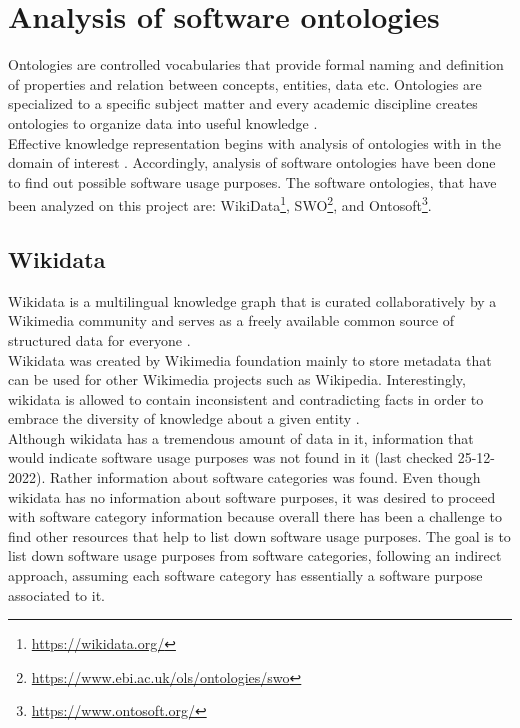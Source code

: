 \section{Analysis of software ontologies }
\label{sec:purpose:ontologies}

Ontologies are controlled vocabularies that provide formal naming and definition of properties and relation between concepts, entities, data etc.  Ontologies  are specialized  to a specific subject matter and every academic discipline creates ontologies to organize data into useful knowledge \citep{enwiki:1060388948}. \\

Effective knowledge representation begins with analysis of ontologies with in the domain of interest \citep{chandrasekaran1999ontologies}. Accordingly, analysis of software ontologies have been done to find out possible software usage purposes. The software ontologies, that have been analyzed on this project are: WikiData\footnote{\url{https://wikidata.org/}}, \ac{SWO}\footnote{\url{https://www.ebi.ac.uk/ols/ontologies/swo}}, and Ontosoft\footnote{\url{https://www.ontosoft.org/}}. 

 
\subsection{Wikidata}
\label{subsec:purpose:ontologies:Wikidata}

Wikidata is a multilingual knowledge graph that is curated collaboratively by a Wikimedia community and serves as a freely available common source of structured data for everyone \citep{enwiki:1060114687, enwiki:1060408581}. \\

Wikidata was created by Wikimedia foundation mainly to store metadata that can be used for other Wikimedia projects such as Wikipedia. Interestingly, wikidata is allowed to contain inconsistent and contradicting facts in order to embrace the diversity of knowledge about a given entity \citep{vrandevcic2012wikidata}. \\

Although wikidata has a tremendous amount of data in it, information that would indicate software usage purposes was not found in it (last checked 25-12-2022). Rather information about software categories was found. Even though wikidata has no information about software purposes, it was desired to proceed with software category information because overall there has been a challenge to find other resources that help to list down software usage purposes. The goal is to list down software usage purposes from software categories, following an indirect approach, assuming each software category has essentially a software purpose associated to it. \\

